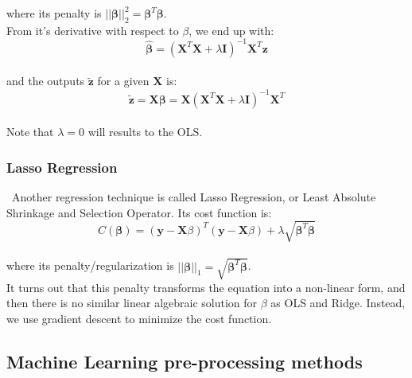 \noindent where its penalty is $||\boldsymbol{\beta}||_2^2 = \boldsymbol{\beta}^T\boldsymbol{\beta}$.\\

From it's derivative with respect to $\beta$, we end up with:\\

\begin{equation}
\label{eq7}
\boldsymbol{\hat\beta} = ( \boldsymbol{X}^T\boldsymbol{X} + \lambda \boldsymbol{I} )^{-1} \boldsymbol{X}^T \boldsymbol{z}
\end{equation}\\

\noindent and the outputs $\boldsymbol{\tilde{z}}$ for a given  $\boldsymbol{X}$ is:\\

\begin{equation}
\label{eq8}
\boldsymbol{\tilde{z}} = \boldsymbol{X\beta} = \boldsymbol{X}(\boldsymbol{X}^T\boldsymbol{X}  + \lambda \boldsymbol{I})^{-1}\boldsymbol{X}^T
\end{equation}\\

Note that $\lambda=0$ will results to the OLS.\\

\subsubsection{Lasso Regression}
\label{chap:Lasso Regression}

\quad \, Another regression technique is called Lasso Regression, or Least Absolute Shrinkage and Selection Operator. Its cost function is:\\

$$C(\boldsymbol{\beta}) = (\boldsymbol{y} - \boldsymbol{X}\beta)^T(\boldsymbol{y} - \boldsymbol{X}\beta) + \lambda \sqrt{\boldsymbol{\beta}^T\boldsymbol{\beta}}$$\\

\noindent where its penalty/regularization is $||\boldsymbol{\beta}||_1 = \sqrt{\boldsymbol{\beta}^T\boldsymbol{\beta}}$.\\

It turns out that this penalty transforms the equation into a non-linear form, and then there is no similar linear algebraic solution for $\beta$ as OLS and Ridge. Instead, we use gradient descent to minimize the cost function.\\

\subsection{Machine Learning pre-processing methods}
\label{chap:Machine Learning pre-processing methods}
